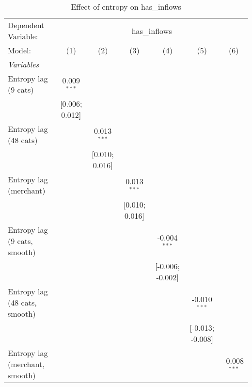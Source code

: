 
\begin{table}[htbp]
   \centering
   \tiny
   \begin{threeparttable}[b]
      \caption{\label{tab:reg_has_inflows_lag_cnz} Effect of entropy on has\_inflows}
      \begin{tabular}{lcccccc}
         \tabularnewline \midrule \midrule
         Dependent Variable: & \multicolumn{6}{c}{has\_inflows}\\
         Model:                         & (1)             & (2)             & (3)             & (4)              & (5)              & (6)\\  
         \midrule
         \emph{Variables}\\
         Entropy lag (9 cats)           & 0.009$^{***}$   &                 &                 &                  &                  &   \\   
                                        & [0.006; 0.012]  &                 &                 &                  &                  &   \\   
         Entropy lag (48 cats)          &                 & 0.013$^{***}$   &                 &                  &                  &   \\   
                                        &                 & [0.010; 0.016]  &                 &                  &                  &   \\   
         Entropy lag (merchant)         &                 &                 & 0.013$^{***}$   &                  &                  &   \\   
                                        &                 &                 & [0.010; 0.016]  &                  &                  &   \\   
         Entropy lag (9 cats, smooth)   &                 &                 &                 & -0.004$^{***}$   &                  &   \\   
                                        &                 &                 &                 & [-0.006; -0.002] &                  &   \\   
         Entropy lag (48 cats, smooth)  &                 &                 &                 &                  & -0.010$^{***}$   &   \\   
                                        &                 &                 &                 &                  & [-0.013; -0.008] &   \\   
         Entropy lag (merchant, smooth) &                 &                 &                 &                  &                  & -0.008$^{***}$\\   

\end{tabular}
\end{threeparttable}
\end{table}
